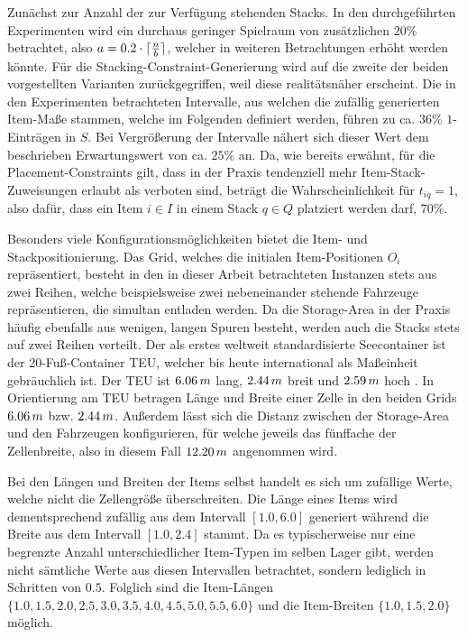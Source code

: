 Zunächst zur Anzahl der zur Verfügung stehenden Stacks. In den durchgeführten Experimenten wird ein durchaus geringer Spielraum von
zusätzlichen $20 \%$ betrachtet, also $a = 0.2 \cdot \lceil\frac{n}{b}\rceil$, welcher in weiteren Betrachtungen erhöht werden könnte.
Für die Stacking-Constraint-Generierung wird auf die zweite der beiden vorgestellten Varianten zurückgegriffen,
weil diese realitätsnäher erscheint. Die in den Experimenten betrachteten Intervalle, aus welchen die zufällig generierten
Item-Maße stammen, welche im Folgenden definiert werden, führen zu ca. $36\%$ $1$-Einträgen in $S$.
Bei Vergrößerung der Intervalle nähert sich dieser Wert dem beschrieben Erwartungswert von ca. $25\%$ an.
Da, wie bereits erwähnt, für die Placement-Constraints gilt, dass in der Praxis tendenziell mehr Item-Stack-Zuweisungen erlaubt
als verboten sind, beträgt die Wahrscheinlichkeit für $t_{iq} = 1$, also dafür, dass ein Item $i \in I$ in einem
Stack $q \in Q$ platziert werden darf, $70 \%$.

Besonders viele Konfigurationsmöglichkeiten bietet die Item- und Stackpositionierung.
Das Grid, welches die initialen Item-Positionen $O_i$ repräsentiert, besteht in den in dieser Arbeit betrachteten
Instanzen stets aus zwei Reihen, welche beispielsweise zwei nebeneinander stehende Fahrzeuge repräsentieren,
die simultan entladen werden. Da die Storage-Area in der Praxis häufig ebenfalls aus wenigen, langen Spuren besteht,
werden auch die Stacks stets auf zwei Reihen verteilt.
Der als erstes weltweit standardisierte Seecontainer ist der 20-Fuß-Container TEU, welcher bis heute
international als Maßeinheit gebräuchlich ist. Der TEU ist $6.06 \thinspace m$ lang, $2.44 \thinspace m$ breit
und $2.59 \thinspace m$ hoch \cite{ContainerBasis}.
In Orientierung am TEU betragen Länge und Breite einer Zelle in den beiden Grids $6.06 \thinspace m$ bzw.
$2.44 \thinspace m$. Außerdem lässt sich die Distanz zwischen der Storage-Area und den Fahrzeugen konfigurieren,
für welche jeweils das fünffache der Zellenbreite, also in diesem Fall $12.20 \thinspace m$ angenommen wird.

Bei den Längen und Breiten der Items selbst handelt es sich um zufällige Werte, welche nicht die Zellengröße überschreiten.
Die Länge eines Items wird dementsprechend zufällig aus dem Intervall $[1.0, 6.0]$ generiert während die Breite aus dem
Intervall $[1.0, 2.4]$ stammt. Da es typischerweise nur eine begrenzte Anzahl unterschiedlicher Item-Typen im selben Lager
gibt, werden nicht sämtliche Werte aus diesen Intervallen betrachtet, sondern lediglich in Schritten von $0.5$.
Folglich sind die Item-Längen $\{1.0, 1.5, 2.0, 2.5, 3.0, 3.5, 4.0, 4.5, 5.0, 5.5, 6.0\}$ und
die Item-Breiten $\{1.0, 1.5, 2.0\}$ möglich.

